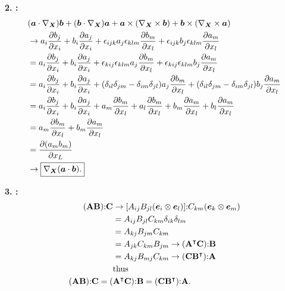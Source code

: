 \textbf{2. :}
\begin{align*}
    &(\bm{a} \cdot \nabla_{\bm{X}}) \bm{b} + (\bm{b} \cdot \nabla_{\bm{X}}) \bm{a} + \bm{a} \times (\nabla_{\bm{X}} \times \bm{b}) + \bm{b} \times (\nabla_{\bm{X}} \times \bm{a}) \\
    &\rightarrow a_i \frac{\partial b_j}{\partial x_i} + b_i \frac{\partial a_j}{\partial x_i} + \epsilon_{ijk} a_j \epsilon_{klm} \frac{\partial b_m}{\partial x_l} + \epsilon_{ijk} b_j \epsilon_{klm} \frac{\partial a_m}{\partial x_l}\\
    &= a_i \frac{\partial b_j}{\partial x_i} + b_i \frac{\partial a_j}{\partial x_i} + \epsilon_{kij} \epsilon_{klm} a_j \frac{\partial b_m}{\partial x_l} + \epsilon_{kij} \epsilon_{klm} b_j \frac{\partial a_m}{\partial x_l}\\
    &= a_i \frac{\partial b_j}{\partial x_i} + b_i \frac{\partial a_j}{\partial x_i} + (\delta_{il} \delta_{jm} - \delta_{im} \delta_{jl}) a_j \frac{\partial b_m}{\partial x_l} + (\delta_{il} \delta_{jm} - \delta_{im} \delta_{jl}) b_j \frac{\partial a_m}{\partial x_l}\\
    &= a_i \frac{\partial b_j}{\partial x_i} + b_i \frac{\partial a_j}{\partial x_i} + a_m \frac{\partial b_m}{\partial x_l} + a_l \frac{\partial b_m}{\partial x_l}  + b_m \frac{\partial a_m}{\partial x_l} + b_l \frac{\partial a_m}{\partial x_l}\\
    &= a_m \frac{\partial b_m}{\partial x_l} + b_m \frac{\partial a_m}{\partial x_l}\\
    &= \frac{\partial (a_m b_m)}{\partial x_L}\\
    &\rightarrow \boxed{\nabla_{\bm{X}} (\bm{a} \cdot \bm{b}).}
\end{align*}

\textbf{3. :}
\begin{align*}
    (\mathbf{A} \mathbf{B}) \mathbf{:} \mathbf{C} &\rightarrow [ A_{ij} B_{jl} (\bm{e}_i \otimes \bm{e}_l)] \mathbf{:} C_{km} (\bm{e}_k \otimes \bm{e}_m)\\
    &= A_{ij} B_{jl} C_{km} \delta_{ik} \delta_{lm}\\
    &= A_{kj} B_{jm} C_{km} \\
    &= A_{jk} C_{km} B_{jm} \rightarrow (\mathbf{A}^\intercal \mathbf{C}) \mathbf{:} \mathbf{B}\\
    &= A_{kj} B_{mj} C_{km} \rightarrow (\mathbf{C} \mathbf{B}^\intercal) \mathbf{:} \mathbf{A}\\
    &\text{thus}\\
     (\mathbf{A} \mathbf{B}) \mathbf{:} \mathbf{C} = (&\mathbf{A}^\intercal \mathbf{C}) \mathbf{:} \mathbf{B} = (\mathbf{C} \mathbf{B}^\intercal) \mathbf{:} \mathbf{A}.
\end{align*}

